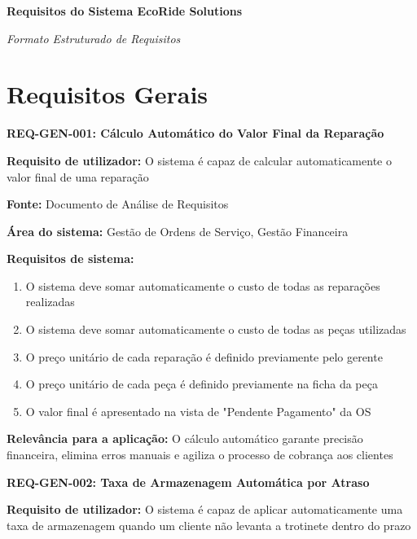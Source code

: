 \documentclass[11pt,a4paper]{article}
\newcommand{\reqheader}[1]{{\noindent\large\bfseries\color{sectionblue}#1}\par\vspace{0.3cm}}
\newcommand{\reqfield}[2]{{\noindent\textbf{#1:} #2}\par\vspace{0.2cm}}
\begin{document}
	
	{\noindent\LARGE\bfseries\color{primaryblue} Requisitos do Sistema EcoRide Solutions}
	
	{\noindent\large\textit{Formato Estruturado de Requisitos}}\par\vspace{1cm}


\section*{Requisitos Gerais}

\reqheader{REQ-GEN-001: Cálculo Automático do Valor Final da Reparação}

\reqfield{Requisito de utilizador}{O sistema é capaz de calcular automaticamente o valor final de uma reparação}

\reqfield{Fonte}{Documento de Análise de Requisitos}

\reqfield{Área do sistema}{Gestão de Ordens de Serviço, Gestão Financeira}

\reqfield{Requisitos de sistema}{
	\begin{enumerate}
		\item O sistema deve somar automaticamente o custo de todas as reparações realizadas
		\item O sistema deve somar automaticamente o custo de todas as peças utilizadas
		\item O preço unitário de cada reparação é definido previamente pelo gerente
		\item O preço unitário de cada peça é definido previamente na ficha da peça
		\item O valor final é apresentado na vista de "Pendente Pagamento" da OS
	\end{enumerate}
}

\reqfield{Relevância para a aplicação}{O cálculo automático garante precisão financeira, elimina erros manuais e agiliza o processo de cobrança aos clientes}

\vspace{0.8cm}

\reqheader{REQ-GEN-002: Taxa de Armazenagem Automática por Atraso}

\reqfield{Requisito de utilizador}{O sistema é capaz de aplicar automaticamente uma taxa de armazenagem quando um cliente não levanta a trotinete dentro do prazo}
\end{document}
